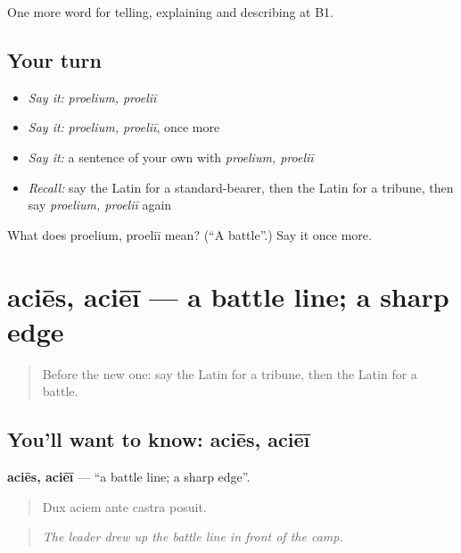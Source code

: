 \begin{grammarlens}[title={What you've built}]
One more word for telling, explaining and describing at B1.
\end{grammarlens}

\subsection*{Your turn}
\begin{itemize}
\raggedright
  \item \emph{Say it:} \emph{proelium, proeliī}
  \item \emph{Say it:} \emph{proelium, proeliī}, once more
  \item \emph{Say it:} a sentence of your own with \emph{proelium, proeliī}
  \item \emph{Recall:} say the Latin for a standard-bearer, then the Latin for a tribune, then say \emph{proelium, proeliī} again
\end{itemize}

\begin{tcolorbox}[breakable,colback=teal!4,colframe=teal!35!black,title={Before you move on}]
What does proelium, proeliī mean? (\textquotedblleft{}A battle\textquotedblright{}.) Say it once more.
\end{tcolorbox}
\section[aciēs, aciēī]{aciēs, aciēī — a battle line; a sharp edge}

\label{lesson:LA-C339-acies}



\begin{quote}
Before the new one: say the Latin for a tribune, then the Latin for a battle.
\end{quote}

\subsection*{You'll want to know: aciēs, aciēī}
\textbf{aciēs, aciēī} — \textquotedblleft{}a battle line; a sharp edge\textquotedblright{}.

\begin{quote}
Dux aciem ante castra posuit.
\end{quote}

\begin{quote}
\emph{The leader drew up the battle line in front of the camp.}
\end{quote}


